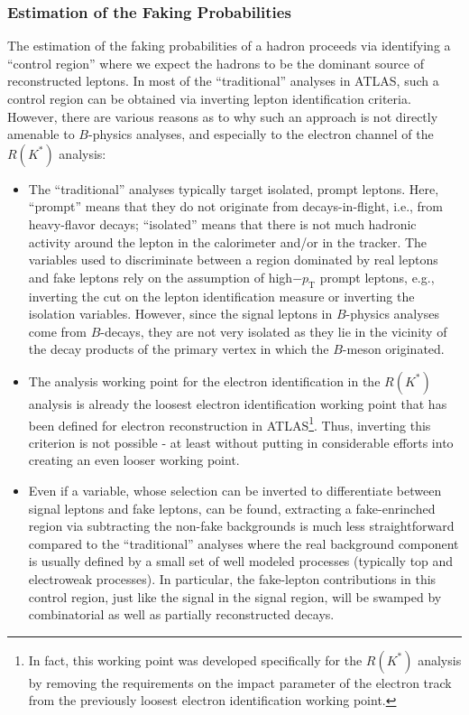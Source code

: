\subsubsection{Estimation of the Faking Probabilities}
\label{subsec:estimation-of-faking-probabilities}
The estimation of the faking probabilities of a hadron proceeds via identifying a ``control region'' where we expect the hadrons to be the dominant source of reconstructed leptons. %
In most of the ``traditional'' analyses in ATLAS, such a control region can be obtained via inverting lepton identification criteria. %
However, there are various reasons as to why such an approach is not directly amenable to $B$-physics analyses, and especially to the electron channel of the $R(K^\ast)$ analysis:
\begin{itemize}
    \item The “traditional” analyses typically target isolated, prompt leptons. Here, ``prompt'' means that they do not originate from decays-in-flight, i.e., from heavy-flavor decays; ``isolated'' means that there is not much hadronic activity around the lepton in the calorimeter and/or in the tracker. The variables used to discriminate between a region dominated by real leptons and fake leptons rely on the assumption of high$-p_{\text{T} }$ prompt leptons, e.g., inverting the cut on the lepton identification measure or inverting the isolation variables. %
    However, since the signal leptons in $B$-physics analyses come from $B$-decays, they are not very isolated as they lie in the vicinity of the decay products of the primary vertex in which the $B$-meson originated. %
    \item The analysis working point for the electron identification in the $R(K^\ast)$ analysis is already the loosest electron identification working point that has been defined for electron reconstruction in ATLAS\footnote{In fact, this working point was developed specifically for the $R(K^\ast)$ analysis by removing the requirements on the impact parameter of the electron track from the previously loosest electron identification working point.}. %
    Thus, inverting this criterion is not possible - at least without putting in considerable efforts into creating an even looser working point.
    \item Even if a variable, whose selection can be inverted to differentiate between signal leptons and fake leptons, can be found, extracting a fake-enrinched region via subtracting the non-fake backgrounds is much less straightforward compared to the “traditional” analyses where the real background component is usually defined by a small set of well modeled processes (typically top and electroweak processes). %
    In particular, the fake-lepton contributions in this control region, just like the signal in the signal region, will be swamped by combinatorial as well as partially reconstructed decays. 
\end{itemize}
